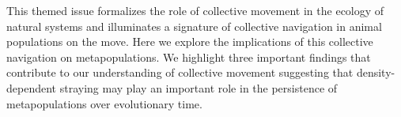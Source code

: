 \documentclass{revtex4}
\begin{document}



This themed issue formalizes the role of collective movement in the ecology of natural systems and illuminates a signature of collective navigation in animal populations on the move.
Here we explore the implications of this collective navigation on metapopulations.
We highlight three important findings that contribute to our understanding of collective movement suggesting that density-dependent straying may play an important role in the persistence of metapopulations over evolutionary time.
\end{document}

